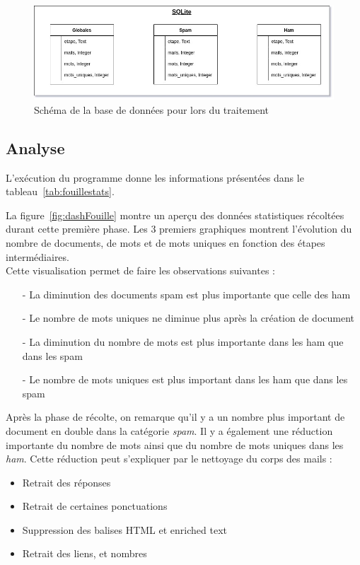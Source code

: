         \begin{figure}[H]
            \includegraphics[width=\linewidth]{img/Schemasqlite}
            \caption{Schéma de la base de données pour lors du traitement}
            \label{fig:sqlite_schema}
        \end{figure}

\subsection*{Analyse}
    L'exécution du programme donne les informations présentées dans le tableau~\ref{tab:fouillestats}.
    
    
    La figure~\ref{fig:dashFouille} montre un aperçu des données statistiques récoltées durant cette première phase.
    Les 3 premiers graphiques montrent l'évolution du nombre de documents, de mots et de mots uniques en fonction des étapes intermédiaires.\\
    Cette visualisation permet de faire les observations suivantes :
    \begin{itemize}
        \item[-] La diminution des documents spam est plus importante que celle des ham
		\item[-] Le nombre de mots uniques ne diminue plus après la création de document
		\item[-] La diminution du nombre de mots est plus importante dans les ham que dans les spam
		\item[-] Le nombre de mots uniques est plus important dans les ham que dans les spam
    \end{itemize}
    Après la phase de récolte, on remarque qu'il y a un nombre plus important de document en double dans la catégorie \emph{spam}.
    Il y a également une réduction importante du nombre de mots ainsi que du nombre de mots uniques dans les \emph{ham}.
    Cette réduction peut s'expliquer par le nettoyage du corps des mails :
    \begin{itemize}
        \item Retrait des réponses
        \item Retrait de certaines ponctuations
        \item Suppression des balises HTML et enriched text
        \item Retrait des liens, et nombres
    \end{itemize}

